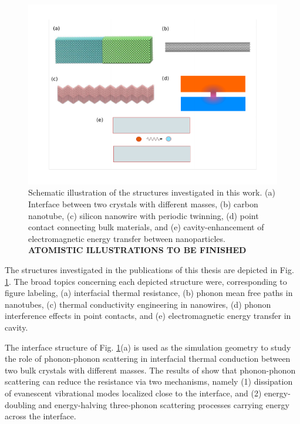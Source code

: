 \begin{figure}
\begin{center}
 \includegraphics[width=.99\columnwidth]{inkscape/systems.pdf}
 \caption{Schematic illustration of the structures investigated in this work. (a) Interface between two crystals with different masses, (b) carbon nanotube, (c) silicon nanowire with periodic twinning, (d) point contact connecting bulk materials, and (e) cavity-enhancement of electromagnetic energy transfer between nanoparticles. \textbf{ATOMISTIC ILLUSTRATIONS TO BE FINISHED}}
\label{fig:intro_structures}
\end{center}
\end{figure}

The structures investigated in the publications of this thesis are depicted in Fig. \ref{fig:intro_structures}. The broad topics concerning each depicted structure were, corresponding to figure labeling, (a) interfacial thermal resistance, (b) phonon mean free paths in nanotubes, (c) thermal conductivity engineering in nanowires, (d) phonon interference effects in point contacts, and (e) electromagnetic energy transfer in cavity. %

The interface structure of Fig. \ref{fig:intro_structures}(a) is used as the simulation geometry to study the role of phonon-phonon scattering in interfacial thermal conduction between two bulk crystals with different masses. The results of  show that phonon-phonon scattering can reduce the resistance via two mechanisms, namely (1) dissipation of evanescent vibrational modes localized close to the interface, and (2) energy-doubling and energy-halving three-phonon scattering processes carrying energy across the interface.  %

